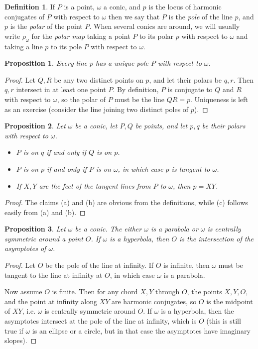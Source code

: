 \documentclass[letterpaper,11pt]{article}
\newtheorem{prop}{Proposition}
\theoremstyle{definition}
\newtheorem{defn}{Definition}
\theoremstyle{remark}
\begin{document}
\begin{defn} If $P$ is a point, $\omega$ a conic, and $p$ is the locus of harmonic conjugates of $P$ with respect to $\omega$ then we say that $P$ is the \emph{pole} of the line $p$, and $p$ is the \emph{polar} of the point $P$. When several conics are around, we will usually write $\rho_\omega$ for the \emph{polar map} taking a point $P$ to its polar $p$ with respect to $\omega$ and taking a line $p$ to its pole $P$ with respect to $\omega$.
\end{defn}

\begin{prop} Every line $p$ has a unique pole $P$ with respect to $\omega$.
\end{prop}
\begin{proof} Let $Q,R$ be any two distinct points on $p$, and let their polars be $q, r$. Then $q,r$ intersect in at least one point $P$. By definition, $P$ is conjugate to $Q$ and $R$ with respect to $\omega$, so the polar of $P$ must be the line $QR = p$. Uniqueness is left as an exercise (consider the line joining two distinct poles of $p$).
\end{proof}

\begin{prop} Let $\omega$ be a conic, let $P,Q$ be points, and let $p,q$ be their polars with respect to $\omega$.
\begin{itemize}
\item[(a)] $P$ is on $q$ if and only if $Q$ is on $p$.
\item[(b)] $P$ is on $p$ if and only if $P$ is on $\omega$, in which case $p$ is tangent to $\omega$.
\item[(c)] If $X,Y$ are the feet of the tangent lines from $P$ to $\omega$, then $p = XY$.
\end{itemize}
\end{prop}
\begin{proof} The claims (a) and (b) are obvious from the definitions, while (c) follows easily from (a) and (b).
\end{proof}

\begin{prop} Let $\omega$ be a conic. The either $\omega$ is a parabola or $\omega$ is centrally symmetric around a point $O$. If $\omega$ is a hyperbola, then $O$ is the intersection of the asymptotes of $\omega$.
\end{prop}
\begin{proof} Let $O$ be the pole of the line at infinity. If $O$ is infinite, then $\omega$ must be tangent to the line at infinity at $O$, in which case $\omega$ is a parabola.

Now assume $O$ is finite. Then for any chord $X,Y$ through $O$, the points $X,Y,O,$ and the point at infinity along $XY$ are harmonic conjugates, so $O$ is the midpoint of $XY$, i.e. $\omega$ is centrally symmetric around $O$. If $\omega$ is a hyperbola, then the asymptotes intersect at the pole of the line at infinity, which is $O$ (this is still true if $\omega$ is an ellipse or a circle, but in that case the asymptotes have imaginary slopes).
\end{proof}
\end{document}
